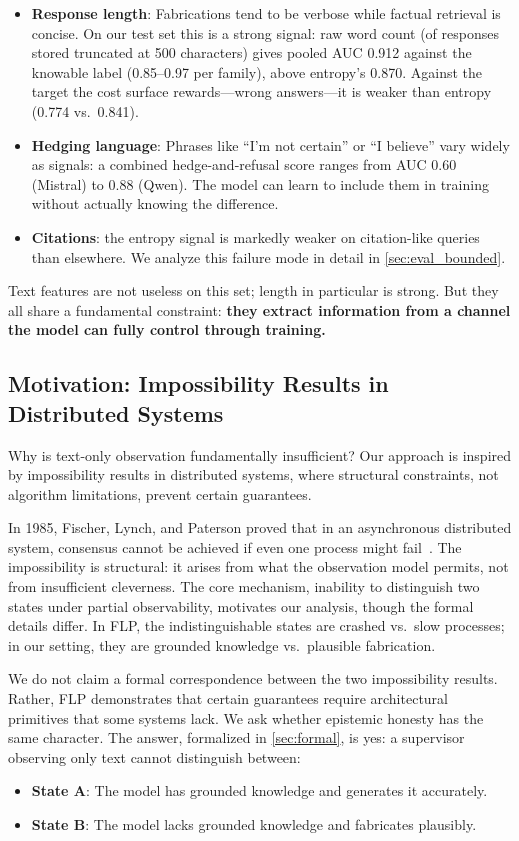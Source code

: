 \documentclass[11pt]{article}
\begin{document}
\begin{itemize}
    \item \textbf{Response length}: Fabrications tend to be verbose while factual retrieval is concise. On our test set this is a strong signal: raw word count (of responses stored truncated at 500 characters) gives pooled AUC 0.912 against the knowable label (0.85--0.97 per family), above entropy's 0.870. Against the target the cost surface rewards---wrong answers---it is weaker than entropy (0.774 vs.\ 0.841).
    \item \textbf{Hedging language}: Phrases like ``I'm not certain'' or ``I believe'' vary widely as signals: a combined hedge-and-refusal score ranges from AUC 0.60 (Mistral) to 0.88 (Qwen). The model can learn to include them in training without actually knowing the difference.
    \item \textbf{Citations}: the entropy signal is markedly weaker on citation-like queries than elsewhere. We analyze this failure mode in detail in \autoref{sec:eval_bounded}.
\end{itemize}

Text features are not useless on this set; length in particular is strong. But they all share a fundamental constraint: \textbf{they extract information from a channel the model can fully control through training.}

\subsection{Motivation: Impossibility Results in Distributed Systems}

Why is text-only observation fundamentally insufficient? Our approach is inspired by impossibility results in distributed systems, where structural constraints, not algorithm limitations, prevent certain guarantees.

In 1985, Fischer, Lynch, and Paterson proved that in an asynchronous distributed system, consensus cannot be achieved if even one process might fail~\citep{flp}. The impossibility is structural: it arises from what the observation model permits, not from insufficient cleverness. The core mechanism, inability to distinguish two states under partial observability, motivates our analysis, though the formal details differ. In FLP, the indistinguishable states are crashed vs.\ slow processes; in our setting, they are grounded knowledge vs.\ plausible fabrication.

We do not claim a formal correspondence between the two impossibility results. Rather, FLP demonstrates that certain guarantees require architectural primitives that some systems lack. We ask whether epistemic honesty has the same character. The answer, formalized in \autoref{sec:formal}, is yes: a supervisor observing only text cannot distinguish between:
\begin{itemize}
    \item \textbf{State A}: The model has grounded knowledge and generates it accurately.
    \item \textbf{State B}: The model lacks grounded knowledge and fabricates plausibly.
\end{itemize}
\end{document}
